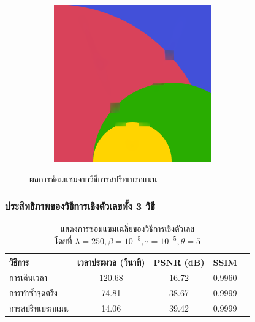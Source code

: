 \documentclass[xcolor=dvipsnames, xetex,serif]{beamer}
\numberwithin{equation}{section}
\begin{document}
\begin{frame}
\begin{figure}[H]
\begin{subfigure}{0.15\linewidth}
            \end{subfigure}
            \begin{subfigure}{0.15\linewidth}
                \centering
                \includegraphics[width=0.9\linewidth]{images/result_ex1/splitbergman05.png}
            \end{subfigure}
            \caption{ผลการซ่อมแซมจากวิธีการสปริทเบรกแมน}
        \end{figure}
    \end{frame}
    \begin{frame}
        \frametitle{ประสิทธิภาพของวิธีการเชิงตัวเลขทั้ง 3 วิธี}
        \begin{table}[H]
        \centering
        \captionsetup{justification=centering}
            \begin{tabular}[ht]{|l|c|c|c|c|}
                \hline
                วิธีการ  & เวลาประมวล  (วินาที) & PSNR (dB) & SSIM \\
                \hline
                การเดินเวลา & 120.68 & 16.72 & 0.9960 \\
                การทำซ้ำจุดตรึง & 74.81 & 38.67 & 0.9999 \\
                การสปริทเบรกแมน & 14.06 & 39.42 & 0.9999  \\
                \hline
            \end{tabular}
        \caption{แสดงการซ่อมแซมเฉลี่ยของวิธีการเชิงตัวเลข \\ โดยที่ $\lambda = 250, \beta = 10^{-5}, \tau = 10^{-5}, \theta = 5 $}
        \end{table}	
    \end{frame}
\end{document}
